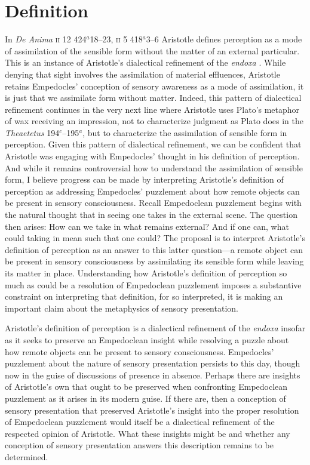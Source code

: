 
\section{Definition} %
\label{sec:definition}

In \emph{De Anima} \textsc{ii} 12 424\( ^{a} \)18--23, \textsc{ii} 5 418\( ^{a} \)3--6 Aristotle defines perception as a mode of assimilation of the sensible form without the matter of an external particular. This is an instance of Aristotle's dialectical refinement of the \emph{endoxa} \citep[on Aristotle's dialectic in \emph{De Anima} see][]{Witt:1995kx}. While denying that sight involves the assimilation of material effluences, Aristotle retains Empedocles' conception of sensory awareness as a mode of assimilation, it is just that we assimilate form without matter. Indeed, this pattern of dialectical refinement continues in the very next line where Aristotle uses Plato's metaphor of wax receiving an impression, not to characterize judgment as Plato does in the \emph{Theaetetus} 194\( ^{c} \)--195\( ^{a} \), but to characterize the assimilation of sensible form in perception. Given this pattern of dialectical refinement, we can be confident that Aristotle was engaging with Empedocles' thought in his definition of perception. And while it remains controversial how to understand the assimilation of sensible form, I believe progress can be made by interpreting Aristotle's definition of perception as addressing Empedocles' puzzlement about how remote objects can be present in sensory consciousness. Recall Empedoclean puzzlement begins with the natural thought that in seeing one takes in the external scene. The question then arises: How can we take in what remains external? And if one can, what could taking in mean such that one could? The proposal is to interpret Aristotle's definition of perception as an answer to this latter question---a remote object can be present in sensory consciousness by assimilating its sensible form while leaving its matter in place. Understanding how Aristotle's definition of perception so much as could be a resolution of Empedoclean puzzlement imposes a substantive constraint on interpreting that definition, for so interpreted, it is making an important claim about the metaphysics of sensory presentation.

Aristotle's definition of perception is a dialectical refinement of the \emph{endoxa} insofar as it seeks to preserve an Empedoclean insight while resolving a puzzle about how remote objects can be present to sensory consciousness. Empedocles' puzzlement about the nature of sensory presentation persists to this day, though now in the guise of discussions of presence in absence. Perhaps there are insights of Aristotle's own that ought to be preserved when confronting Empedoclean puzzlement as it arises in its modern guise. If there are, then a conception of sensory presentation that preserved Aristotle's insight into the proper resolution of Empedoclean puzzlement would itself be a dialectical refinement of the respected opinion of Aristotle. What these insights might be and whether any conception of sensory presentation answers this description remains to be determined.


